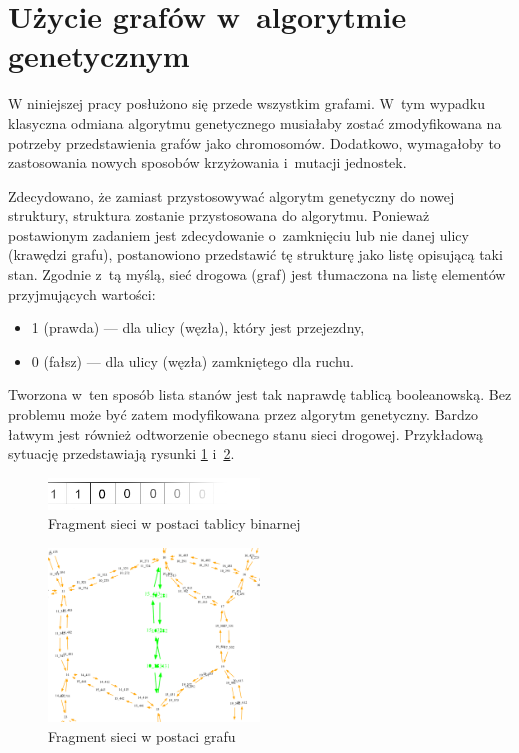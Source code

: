\documentclass[twoside,12pt]{report}
\begin{document}
\section{Użycie grafów w~algorytmie genetycznym}

W niniejszej pracy posłużono się przede wszystkim grafami. W~tym wypadku klasyczna odmiana algorytmu genetycznego musiałaby zostać zmodyfikowana na potrzeby przedstawienia grafów jako chromosomów. Dodatkowo, wymagałoby to zastosowania nowych sposobów krzyżowania i~mutacji jednostek. 

Zdecydowano, że zamiast przystosowywać algorytm genetyczny do nowej struktury, struktura zostanie przystosowana do algorytmu. Ponieważ postawionym zadaniem jest zdecydowanie o~zamknięciu lub nie danej ulicy (krawędzi grafu), postanowiono przedstawić tę strukturę jako listę opisującą taki stan. Zgodnie z~tą myślą, sieć drogowa (graf) jest tłumaczona na listę elementów przyjmujących wartości:

\begin{itemize}
\item 1 (prawda) --- dla ulicy (węzła), który jest przejezdny,
\item 0 (fałsz) --- dla ulicy (węzła) zamkniętego dla ruchu.
\end{itemize}

Tworzona w~ten sposób lista stanów jest tak naprawdę tablicą booleanowską. Bez problemu może być zatem modyfikowana przez algorytm genetyczny. Bardzo łatwym jest również odtworzenie obecnego stanu sieci drogowej. Przykładową sytuację przedstawiają rysunki \ref{fig:bool_network_example} i~\ref{fig:graph_network_example}.


\begin{figure}[ht]
	\centering
	\includegraphics[width=0.5\textwidth]{img/bool}
	\caption{Fragment sieci w postaci tablicy binarnej }
	\label{fig:bool_network_example}
\end{figure}
\begin{figure}[ht]
	\centering
	\includegraphics[width=0.5\textwidth]{img/bool-efect}
	\caption{Fragment sieci w postaci grafu}
	\label{fig:graph_network_example}
\end{figure}
\end{document}
